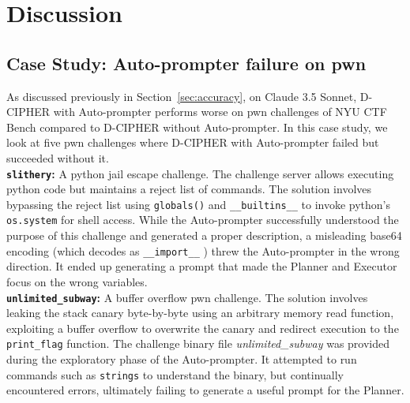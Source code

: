 \section{Discussion} \label{sec:discussion}

\subsection{Case Study: Auto-prompter failure on pwn} \label{sec:autoprompter_casestudy}

As discussed previously in Section~\ref{sec:accuracy},
on Claude 3.5 Sonnet, D-CIPHER with Auto-prompter performs worse on pwn challenges of NYU CTF Bench compared to D-CIPHER without Auto-prompter.
In this case study, we look at five pwn challenges where D-CIPHER with Auto-prompter failed but succeeded without it.
\\


\noindent
\textbf{\texttt{slithery}:} A python jail escape challenge. The challenge server allows executing python code but maintains a reject list of commands. The solution involves bypassing the reject list using \texttt{globals()} and  \texttt{\_\_builtins\_\_} to invoke python’s \texttt{os.system} for shell access. While the Auto-prompter successfully understood the purpose of this challenge and generated a proper description,  a misleading base64 encoding (which decodes as \texttt{\_\_import\_\_} ) threw the Auto-prompter in the wrong direction. It ended up generating a prompt that made the Planner and Executor focus on the wrong variables.
\\

\noindent
\textbf{\texttt{unlimited\_subway}:} A buffer overflow pwn challenge. The solution involves leaking the stack canary byte-by-byte using an arbitrary memory read function, exploiting a buffer overflow to overwrite the canary and redirect execution to the \texttt{print\_flag} function. The challenge binary file \textit{unlimited\_subway} was provided during the exploratory phase of the Auto-prompter. It attempted to run commands such as \texttt{strings} to understand the binary, but continually encountered errors, ultimately failing to generate a useful prompt for the Planner.
\\

